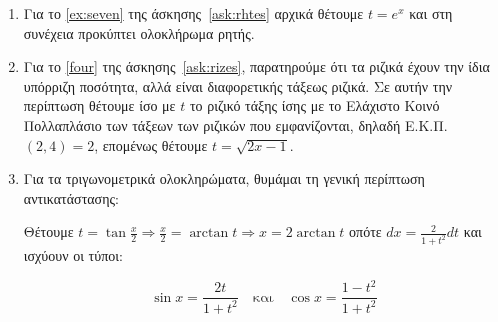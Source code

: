 \begin{center}
  \minibox{\bfseries\large \textcolor{Col1}{Παρατηρήσεις-Υποδείξεις}}
\end{center}

\vspace{\baselineskip}

\begin{enumerate}
  \item Για το \ref{ex:seven} της άσκησης~\eqref{ask:rhtes} αρχικά θέτουμε $
    t = e^{x} $ και στη συνέχεια προκύπτει ολοκλήρωμα ρητής.
  \item Για το \ref{four} της άσκησης~\eqref{ask:rizes}, παρατηρούμε ότι τα ριζικά 
    έχουν την ίδια υπόρριζη ποσότητα, αλλά είναι διαφορετικής τάξεως ριζικά. 
    Σε αυτήν την περίπτωση θέτουμε ίσο με $t$ το ριζικό τάξης ίσης με το Ελάχιστο Κοινό
    Πολλαπλάσιο των τάξεων των ριζικών που εμφανίζονται, δηλαδή Ε.Κ.Π. $(2,4)
    = 2 $, επομένως θέτουμε $t=\sqrt{2x-1}$. 
  \item Για τα τριγωνομετρικά ολοκληρώματα, θυμάμαι τη γενική περίπτωση αντικατάστασης: 
    \begin{center}
      Θέτουμε $ t = \tan{\frac{x}{2}} \Rightarrow \frac{x}{2} = \arctan{t} 
      \Rightarrow x = 2 \arctan {t} $ οπότε $ dx = \frac{2}{1 + t^{2}} dt $ 
      και ισχύουν οι τύποι:
    \end{center}
    \[
      \boxed{\sin x=\frac{2t}{1+t^2}} \quad \text{και} \quad \boxed{\cos x
      =\frac{1-t^2}{1+t^2}}
    \] 
\end{enumerate}



